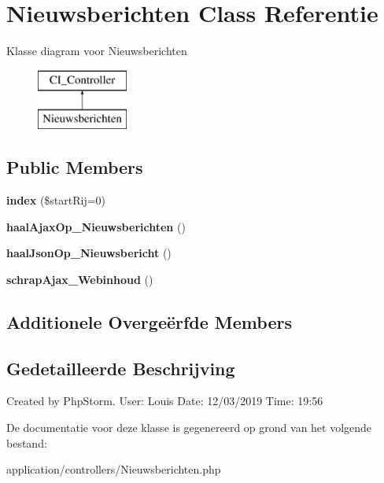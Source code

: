 \hypertarget{class_nieuwsberichten}{}\section{Nieuwsberichten Class Referentie}
\label{class_nieuwsberichten}
Klasse diagram voor Nieuwsberichten\begin{figure}[H]
\begin{center}
\leavevmode
\includegraphics[height=2.000000cm]{class_nieuwsberichten}
\end{center}
\end{figure}
\subsection*{Public Members}
\begin{DoxyCompactItemize}
\item 
\mbox{\label{class_nieuwsberichten_aa05469d69d03cc799a38b3882c8b2917}} 
{\bfseries index} (\$start\+Rij=0)
\item 
\mbox{\label{class_nieuwsberichten_a8bb45ad9125141c6b040083820739060}} 
{\bfseries haal\+Ajax\+Op\+\_\+\+Nieuwsberichten} ()
\item 
\mbox{\label{class_nieuwsberichten_a083eabe68fd49021ef0ad357e7bb30ab}} 
{\bfseries haal\+Json\+Op\+\_\+\+Nieuwsbericht} ()
\item 
\mbox{\label{class_nieuwsberichten_a9e0cde7149b294cdcbe4a8a45ff9f6a6}} 
{\bfseries schrap\+Ajax\+\_\+\+Webinhoud} ()
\end{DoxyCompactItemize}
\subsection*{Additionele Overge\"{e}rfde Members}


\subsection{Gedetailleerde Beschrijving}
Created by Php\+Storm. User\+: Louis Date\+: 12/03/2019 Time\+: 19\+:56 

De documentatie voor deze klasse is gegenereerd op grond van het volgende bestand\+:\begin{DoxyCompactItemize}
\item 
application/controllers/Nieuwsberichten.\+php\end{DoxyCompactItemize}
